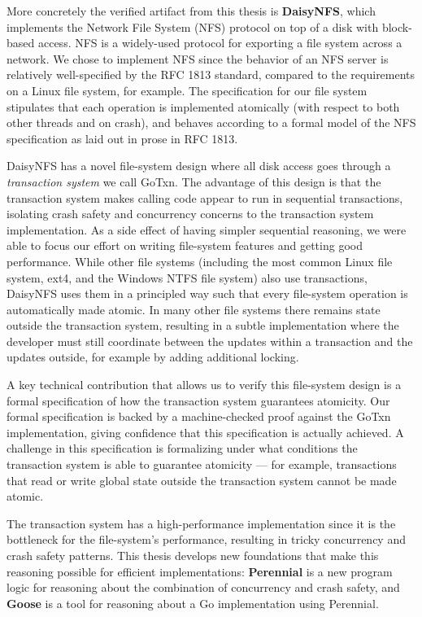 More concretely the verified
artifact from this thesis is \textbf{DaisyNFS}, which implements the Network
File System (NFS) protocol on top of a disk with block-based access. NFS is a
widely-used protocol for exporting a file system across a network. We chose to
implement NFS since the behavior of an NFS server is relatively well-specified
by the RFC 1813 standard, compared to the requirements on a Linux file system,
for example. The specification for our file system stipulates that each
operation is implemented atomically (with respect to both other threads and on
crash), and behaves according to a formal model of the NFS specification as laid
out in prose in RFC 1813.

DaisyNFS has a novel file-system design where all disk access goes through a
\emph{transaction system} we call GoTxn. The advantage of this design is that the
transaction system makes calling code appear to run in sequential transactions,
isolating crash safety and concurrency concerns to the transaction system
implementation. As a side effect of having simpler sequential reasoning, we were
able to focus our effort on writing file-system features and getting good
performance. While other file systems (including the most common Linux file
system, ext4, and the Windows NTFS file system) also use transactions, DaisyNFS
uses them in a principled way such that every file-system operation is
automatically made atomic. In many other file systems there remains state
outside the transaction system, resulting in a subtle implementation where the
developer must still coordinate between the updates within a transaction and the
updates outside, for example by adding additional locking.

A key technical contribution that allows us to verify this file-system design is
a formal specification of how the transaction system guarantees atomicity. Our
formal specification is backed by a machine-checked proof against the GoTxn
implementation, giving confidence that this specification is actually achieved.
A challenge in this specification is formalizing under what conditions the
transaction system is able to guarantee atomicity --- for example, transactions
that read or write global state outside the transaction system cannot be made atomic.

The transaction system has a high-performance implementation since it is the
bottleneck for the file-system's performance, resulting in tricky concurrency
and crash safety patterns. This thesis develops new foundations that make this
reasoning possible for efficient implementations: \textbf{Perennial} is a new program logic for
reasoning about the combination of concurrency and crash safety, and
\textbf{Goose} is a tool for reasoning about a Go implementation using Perennial.

